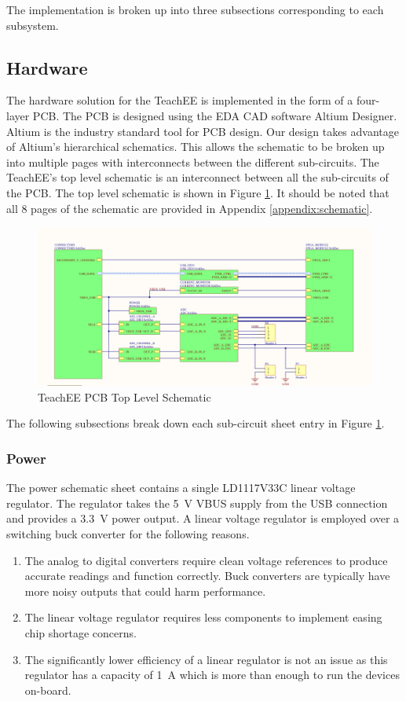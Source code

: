 \documentclass[letterpaper,11pt]{article}
\begin{document}
The implementation is broken up into three subsections corresponding to each
subsystem.

\subsection{Hardware} %
The hardware solution for the TeachEE is implemented in the form of a four-layer
PCB. The PCB is designed using the EDA CAD software Altium Designer. Altium is
the industry standard tool for PCB design. Our design takes advantage of
Altium's hierarchical schematics. This allows the schematic to be broken up into
multiple pages with interconnects between the different sub-circuits. The
TeachEE's top level schematic is an interconnect between all the sub-circuits of
the PCB. The top level schematic is shown in Figure
\ref{fig:hw-top-level-sheet}. It should be noted that all 8 pages of the
schematic are provided in Appendix \ref{appendix:schematic}.

\begin{figure}[H]
  \centering
  \includegraphics[width=\textwidth]{figures/altium-top-level.png}
  \caption{TeachEE PCB Top Level Schematic}
  \label{fig:hw-top-level-sheet}
\end{figure}

The following subsections break down each sub-circuit sheet entry in Figure
\ref{fig:hw-top-level-sheet}.

\subsubsection{Power}
The power schematic sheet contains a single LD1117V33C linear voltage regulator.
The regulator takes the \SI{5}{\volt} VBUS supply from the USB connection and
provides a \SI{3.3}{\volt} power output. A linear voltage regulator is employed
over a switching buck converter for the following reasons.
  \begin{enumerate}
    \item The analog to digital converters require clean voltage references to
      produce accurate readings and function correctly. Buck converters are
      typically have more noisy outputs that could harm performance.
    \item The linear voltage regulator requires less components to implement
      easing chip shortage concerns.
    \item The significantly lower efficiency of a linear regulator is not an
      issue as this regulator has a capacity of \SI{1}{\ampere} which is more
      than enough to run the devices on-board.
  \end{enumerate}
\end{document}
